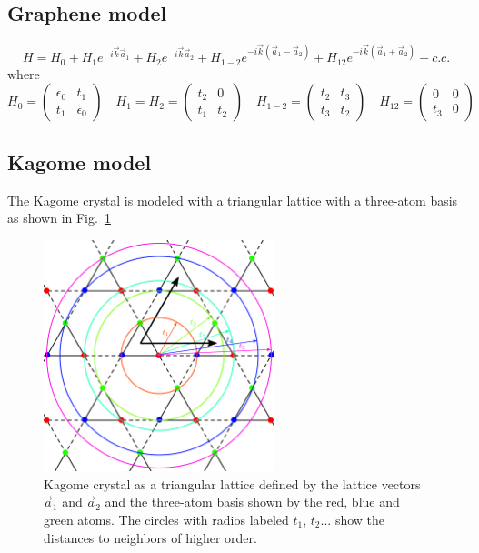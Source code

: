 \subsection{Graphene model}
\begin{equation}
  H = H_0 + H_1e^{-i\vec{k}\vec{a}_1} + H_2e^{-i\vec{k}\vec{a}_2}+
      H_{1-2}e^{-i\vec{k}(\vec{a}_1-\vec{a}_2)}+
      H_{12}e^{-i\vec{k}(\vec{a}_1+\vec{a}_2)} + c.c.
\end{equation}
where
\begin{equation}
  H_0 = \left(\begin{array}{cc}
    \epsilon_0 & t_1 \\
    t_1 & \epsilon_0
  \end{array}\right)\quad
  H_1 = H_2 = \left(\begin{array}{cc}
    t_2 & 0 \\
    t_1 & t_2
  \end{array}\right)\quad
  H_{1-2} = \left(\begin{array}{cc}
    t_2 & t_3 \\
    t_3 & t_2
  \end{array}\right)\quad
  H_{12} = \left(\begin{array}{cc}
    0 & 0 \\
    t_3 & 0
  \end{array}\right)
\end{equation}

\subsection{Kagome model}
The Kagome crystal is modeled with a triangular lattice with a three-atom basis as shown in Fig.~\ref{kagome_lat}

\begin{figure}[h!]
\centering
  \includegraphics[width=0.6\textwidth]{artlat/fig/kagome_neighbors.pdf}
\vspace{-5pt}
\caption{Kagome crystal as a triangular lattice defined by the lattice vectors $\vec{a}_1$ and $\vec{a}_2$ and the three-atom basis shown by the red, blue and green atoms. The circles with radios labeled $t_1$, $t_2$... show the distances to neighbors of higher order.}
\label{kagome_lat}
\end{figure}
\FloatBarrier


